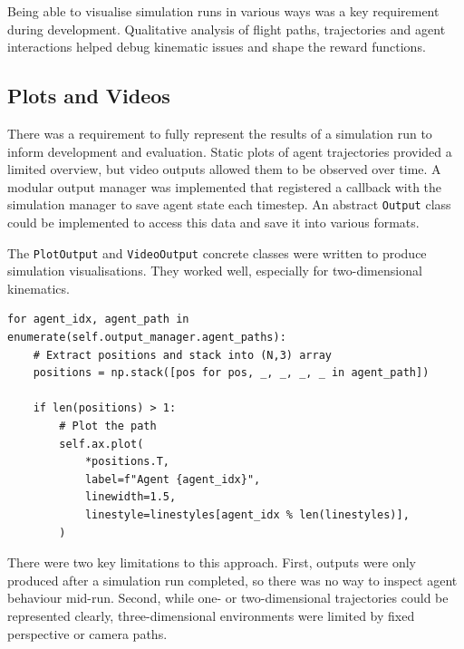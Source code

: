 Being able to visualise simulation runs in various ways was a key requirement during development. Qualitative analysis of flight paths, trajectories and agent interactions helped debug kinematic issues and shape the reward functions.

\subsection{Plots and Videos}
\label{sec:3.4.1}
There was a requirement to fully represent the results of a simulation run to inform development and evaluation. Static plots of agent trajectories provided a limited overview, but video outputs allowed them to be observed over time. A modular output manager was implemented that registered a callback with the simulation manager to save agent state each timestep. An abstract \texttt{Output} class could be implemented to access this data and save it into various formats. 

The \texttt{PlotOutput} and \texttt{VideoOutput} concrete classes were written to produce simulation visualisations. They worked well, especially for two-dimensional kinematics. 

\begin{listing}[H]
\begin{verbatim}
for agent_idx, agent_path in enumerate(self.output_manager.agent_paths):
    # Extract positions and stack into (N,3) array
    positions = np.stack([pos for pos, _, _, _, _ in agent_path])

    if len(positions) > 1:
        # Plot the path
        self.ax.plot(
            *positions.T,
            label=f"Agent {agent_idx}",
            linewidth=1.5,
            linestyle=linestyles[agent_idx % len(linestyles)],
        )
\end{verbatim}
\caption{Plot agent paths on a \texttt{matplotlib} 3D graph, discarding unused kinematic data.}
\label{lst:plot}
\end{listing}


There were two key limitations to this approach. First, outputs were only produced after a simulation run completed, so there was no way to inspect agent behaviour mid-run. Second, while one- or two-dimensional trajectories could be represented clearly, three-dimensional environments were limited by fixed perspective or camera paths.


